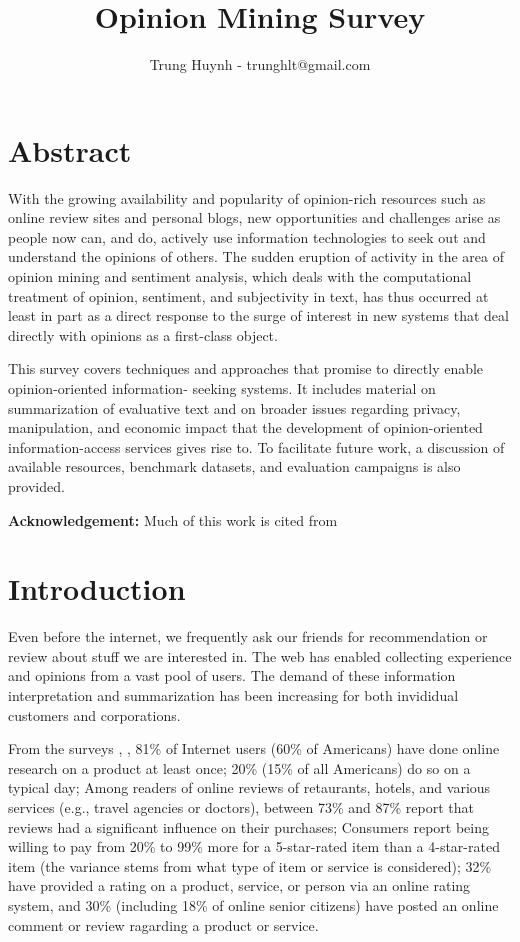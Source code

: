 \documentclass{article}
\title{\textbf{Opinion Mining Survey}}
\author{Trung Huynh - trunghlt@gmail.com}\date{}
\begin{document}
\maketitle
\thispagestyle{fancy}

\begin{multicols}{2}
 

\section{Abstract}
    With the growing availability and popularity 
of opinion-rich resources such as online review sites and personal blogs, new 
opportunities and challenges arise as people now can, and do, actively use 
information technologies to seek out and understand the opinions of others. The 
sudden eruption of activity in the area of opinion mining and sentiment analysis, 
which deals with the computational treatment of opinion, sentiment, and 
subjectivity in text, has thus occurred at least in part as a direct response to 
the surge of interest in new systems that deal directly with opinions as a 
first-class object.

This survey covers techniques and approaches that promise to directly enable 
opinion-oriented information- seeking systems. It includes material on summarization 
of evaluative text and on broader issues regarding privacy, manipulation, and 
economic impact that the development of opinion-oriented information-access services 
gives rise to. To facilitate future work, a discussion of available resources, 
benchmark datasets, and evaluation campaigns is also provided.

   \textbf{Acknowledgement:} Much of this work is cited from \citet{Pang2008}

\section{Introduction}
    Even before the internet, we frequently ask our friends for recommendation
or review about stuff we are interested in. The web has enabled collecting 
experience and opinions from a vast pool of users. The demand of these 
information interpretation and summarization has been increasing for both
invididual customers and corporations.

    From the surveys \citet{comScore2007}, \citet{Horrigan2008}, 81\% of Internet 
users (60\% of Americans) have done online research on a product at least once;
20\% (15\% of all Americans) do so on a typical day; Among readers of online 
reviews of retaurants, hotels, and various services (e.g., travel agencies or 
doctors), between 73\% and 87\% report that reviews had a significant influence 
on their purchases; Consumers report being willing to pay from 20\% to 99\% more for
a 5-star-rated item than a 4-star-rated item (the variance stems from what
type of item or service is considered); 32\% have provided a rating on a product, 
service, or person via an online rating system, and 30\% (including 18\% of 
online senior citizens) have posted an online comment or review ragarding a 
product or service.


\end{multicols}
\end{document}
